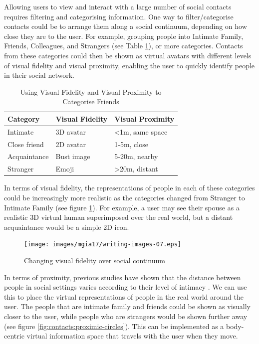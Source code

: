 Allowing users to view and interact with a large number of social contacts requires filtering and categorising information. One way to filter/categorise contacts could be to arrange them along a social continuum, depending on how close they are to the user. For example, grouping people into Intimate Family, Friends, Colleagues, and Strangers (see Table \ref{tbl:visual-fidelity-proximity}), or more categories. Contacts from these categories could then be shown as virtual avatars with different levels of visual fidelity and visual proximity, enabling the user to quickly identify people in their social network.

\begin{table}[b]
    \centering
    \caption{Using Visual Fidelity and Visual Proximity to Categorise Friends}
    \label{tbl:visual-fidelity-proximity}
    \begin{tabular}{|l|l|l|}
        \hline
        \textbf{Category} & \textbf{Visual Fidelity}    & \textbf{Visual Proximity}       \\ \hline
        Intimate          & 3D avatar                     & \textless1m, same space  \\ \hline
        Close friend      & 2D avatar                   & 1-5m, close              \\ \hline
        Acquaintance      & Bust image                    & 5-20m, nearby            \\ \hline
        Stranger          & Emoji                        & \textgreater20m, distant \\ \hline
    \end{tabular}
\end{table}


In terms of visual fidelity, the representations of people in each of these categories could be increasingly more realistic as the categories changed from Stranger to Intimate Family (see figure \ref{fig:contacts:visual-fidelity-continuum}). For example, a user may see their spouse as a realistic 3D virtual human superimposed over the real world, but a distant acquaintance would be a simple 2D icon.

\begin{figure}[ht]
    \centering
    \texttt{[image: images/mgia17/writing-images-07.eps]}
    \caption{Changing visual fidelity over social continuum}
    \label{fig:contacts:visual-fidelity-continuum}
\end{figure}

In terms of proximity, previous studies have shown that the distance between people in social settings varies according to their level of intimacy \cite{Anslow2016}. We can use this to place the virtual representations of people in the real world around the user. The people that are intimate family and friends could be shown as visually closer to the user, while people who are strangers would be shown further away (see figure \ref{fig:contacts:proximic-circles}). This can be implemented as a body-centric virtual information space that travels with the user when they move.

